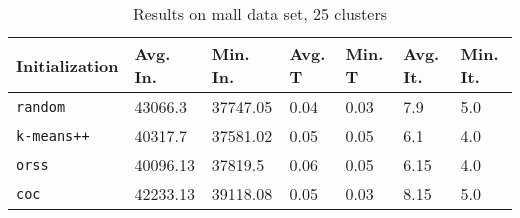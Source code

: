 \begin{table}[h]
	\begin{center}
		\begin{tabular}{|l|l|l|l|l|l|l|}
			\hline
			Initialization & Avg. In. & Min. In. & Avg. T & Min. T & Avg. It. & Min. It.\\\hline
			\texttt{random} & 43066.3 & 37747.05 & 0.04 & 0.03 & 7.9 & 5.0\\\hline
			\texttt{k-means++} & 40317.7 & 37581.02 & 0.05 & 0.05 & 6.1 & 4.0\\\hline
			\texttt{orss} & 40096.13 & 37819.5 & 0.06 & 0.05 & 6.15 & 4.0\\\hline
			\texttt{coc} & 42233.13 & 39118.08 & 0.05 & 0.03 & 8.15 & 5.0\\\hline
		\end{tabular}
		\caption{Results on mall data set, 25 clusters}
		\label{tbl:mall25}
	\end{center}
\end{table}

